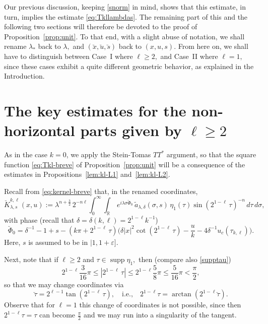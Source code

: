 \documentclass[leqno]{amsart}
\theoremstyle{definition}
\theoremstyle{remark}
\numberwithin{equation}{section}
\newcommand{\R}{\mathbb{R}}
\DeclareMathOperator*{\supp}{supp}
\newcommand\la{{\lambda}}
\newcommand\ve{{\varepsilon}}
\newcommand\de{{\delta}}
\begin{document}
Our previous discussion, keeping \eqref{snorm} in mind, shows that this estimate, in turn, implies the estimate \eqref{eq:Tkllambdas}. The remaining part  of this and the following two sections will therefore be devoted to the proof of Proposition~\ref{prop:unit}. To that end, with a slight abuse of notation, we shall rename ${\lambda_*}$ back to $\lambda,$ and $(\breve x,\breve u,\breve s)$ back to $(x,u,s)$. From here on, we shall have to distinguish between Case~I where $\ell\ge 2,$ and Case~II where $\ell=1,$ since these cases  exhibit a quite different geometric behavior, as explained in the Introduction. 

\section{The key estimates for the non-horizontal parts given by $\ell\ge 2$}\label{CaseI}

As in the case $k=0$, we apply the Stein-Tomas $TT^*$ argument, so that the square function \eqref{eq:Tkl-breve} of Proposition~\ref{prop:unit} will be a consequence of the estimates in Propositions~\ref{lem:kl-L1} and~\ref{lem:kl-L2}.

Recall from \eqref{eq:kernel-breve} that, in the renamed coordinates,
$$ \breve K_{\lambda,s}^{k,\ell}(x,u) := \lambda^{n + \frac 32}\, 2^{-n\ell} \int_0^\infty \int_\R \, e^{i \lambda \sigma \breve \Phi_0} \,\tilde a_{\la,\de}(\sigma,s) \, \eta_1(\tau)   \sin (2^{1-\ell} \, \tau)^{-n} \, d  \tau \, d\sigma,
$$
with phase (recall that $\de=\de(k,\ell)=2^{1-\ell}k^{-1}$)
\[
\breve \Phi_0 = \delta^{-1}-1+s -\left(k\pi + 2^{1-\ell} \, \tau\right)\Big(\delta |x|^2 \cot( 2^{1-\ell} \, \tau) - 
\frac {u}{k} -4\delta^{-1} u_c(\tau_{k,\ell})\Big).
\]
Here, $s$ is assumed to be in $|1,1+\ve].$ 

Next, note that if $\ell\ge 2$ and $ \tau\in \supp \eta_1,$  then (compare also \eqref{supptau})
$$
2^{1-\ell}\frac 3{16} \pi\le  |2^{1-\ell} \, \tau| \le 2^{1-\ell} \frac 5{8}\pi\le \frac 5{16}\pi <\frac{\pi}{2},
$$
so that we may change coordinates via 
$$
\breve\tau = 2^{\ell-1} \tan(2^{1-\ell} \, \tau), \quad \text{i.e.,} \quad  2^{1-\ell} \tau =  \arctan(2^{1-\ell} {\breve\tau}).
$$
Observe that for $\ell=1$ this change of coordinates is not possible, since then $2^{1-\ell}\tau=\tau$ can become $\frac{\pi}{2}$ and we may run into a singularity of the tangent.
\end{document}
